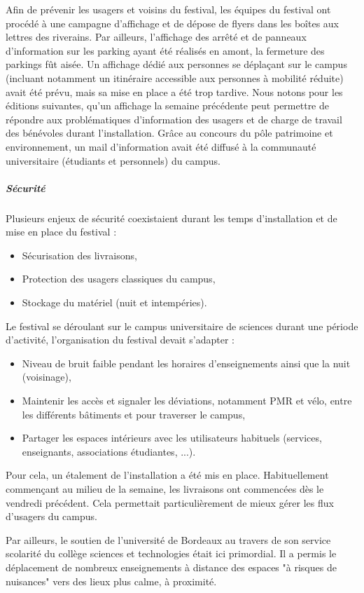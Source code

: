 \documentclass[12pt,a4paper]{report}
\begin{document}
Afin de prévenir les usagers et voisins du festival, les équipes du festival ont procédé à une campagne d'affichage et de dépose de flyers dans les boîtes aux lettres des riverains. Par ailleurs, l'affichage des arrêté et de panneaux d'information sur les parking ayant été réalisés en amont, la fermeture des parkings fût aisée. Un affichage dédié aux personnes se déplaçant sur le campus (incluant notamment un itinéraire accessible aux personnes à mobilité réduite) avait été prévu, mais sa mise en place a été trop tardive. Nous notons pour les éditions suivantes, qu'un affichage la semaine précédente peut permettre de répondre aux problématiques d'information des usagers et de charge de travail des bénévoles durant l'installation. Grâce au concours du pôle patrimoine et environnement, un mail d'information avait été diffusé à la communauté universitaire (étudiants et personnels) du campus.

\subparagraph{Sécurité}

Plusieurs enjeux de sécurité coexistaient durant les temps d'installation et de mise en place du festival : 
\begin{itemize}
\item Sécurisation des livraisons,
\item Protection des usagers classiques du campus,
\item Stockage du matériel (nuit et intempéries).
\end{itemize} 

Le festival se déroulant sur le campus universitaire de sciences durant une période d'activité, l'organisation du festival devait s'adapter : 
\begin{itemize}
\item Niveau de bruit faible pendant les horaires d'enseignements ainsi que la nuit (voisinage),
\item Maintenir les accès et signaler les déviations, notamment PMR et vélo, entre les différents bâtiments et pour traverser le campus,
\item Partager les espaces intérieurs avec les utilisateurs habituels (services, enseignants, associations étudiantes, ...).
\end{itemize}

Pour cela, un étalement de l'installation a été mis en place. Habituellement commençant au milieu de la semaine, les livraisons ont commencées dès le vendredi précédent. Cela permettait particulièrement de mieux gérer les flux d'usagers du campus.

Par ailleurs, le soutien de l'université de Bordeaux au travers de son service scolarité du collège sciences et technologies était ici primordial. Il a permis le déplacement de nombreux enseignements à distance des espaces "à risques de nuisances" vers des lieux plus calme, à proximité.
\end{document}
